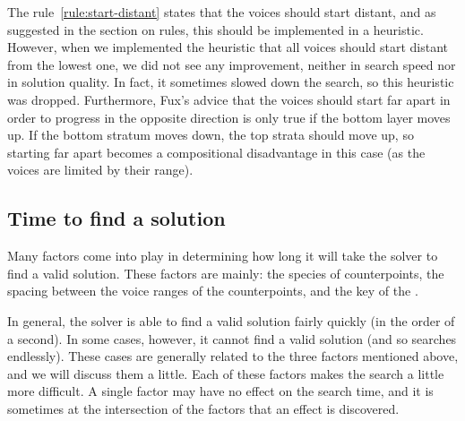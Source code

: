 The rule~\ref{rule:start-distant} states that the voices should start distant, and as suggested in the section on rules, this should be implemented in a heuristic. However, when we implemented the heuristic that all voices should start distant from the lowest one, we did not see any improvement, neither in search speed nor in solution quality. In fact, it sometimes slowed down the search, so this heuristic was dropped. Furthermore, Fux's advice that the voices should start far apart in order to progress in the opposite direction is only true if the bottom layer moves up. If the bottom stratum moves down, the top strata should move up, so starting far apart becomes a compositional disadvantage in this case (as the voices are limited by their range).



\subsection{Time to find a solution} \label{section:time-to-find-a-solution}
Many factors come into play in determining how long it will take the solver to find a valid solution. These factors are mainly: the species of counterpoints, the spacing between the voice ranges of the counterpoints, and the key of the \cf.


In general, the solver is able to find a valid solution fairly quickly (in the order of a second). In some cases, however, it cannot find a valid solution (and so searches endlessly). These cases are generally related to the three factors mentioned above, and we will discuss them a little. Each of these factors makes the search a little more difficult. A single factor may have no effect on the search time, and it is sometimes at the intersection of the factors that an effect is discovered.

